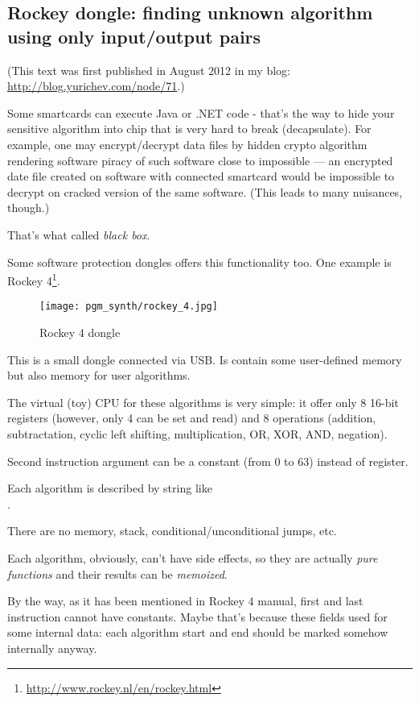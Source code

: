 ﻿\subsection{Rockey dongle: finding unknown algorithm using only input/output pairs}

(This text was first published in August 2012 in my blog: \url{http://blog.yurichev.com/node/71}.)

Some smartcards can execute Java or .NET code - that's the way to hide your sensitive algorithm
into chip that is very hard to break (decapsulate).
For example, one may encrypt/decrypt data files by hidden crypto algorithm rendering software
piracy of such software close to impossible --- an encrypted date file created on software with connected smartcard
would be impossible to decrypt on cracked version of the same software.
(This leads to many nuisances, though.)

That's what called \textit{black box}.

Some software protection dongles offers this functionality too.
One example is Rockey 4\footnote{\url{http://www.rockey.nl/en/rockey.html}}.

\begin{figure}[H]
\centering
\texttt{[image: pgm\_synth/rockey\_4.jpg]}
\caption{Rockey 4 dongle}
\end{figure}

This is a small dongle connected via USB. Is contain some user-defined memory but also memory for user algorithms.

The virtual (toy) CPU for these algorithms is very simple: it offer only 8 16-bit registers
(however, only 4 can be set and read) and 8 operations
(addition, subtractation, cyclic left shifting, multiplication, OR, XOR, AND, negation).

Second instruction argument can be a constant (from 0 to 63) instead of register.

Each algorithm is described by string like \\
.

There are no memory, stack, conditional/unconditional jumps, etc.

Each algorithm, obviously, can't have side effects, so they are actually \textit{pure functions}
and their results can be \textit{memoized}.

By the way, as it has been mentioned in Rockey 4 manual, first and last instruction cannot have constants.
Maybe that's because these fields used for some internal data:
each algorithm start and end should be marked somehow internally anyway.

